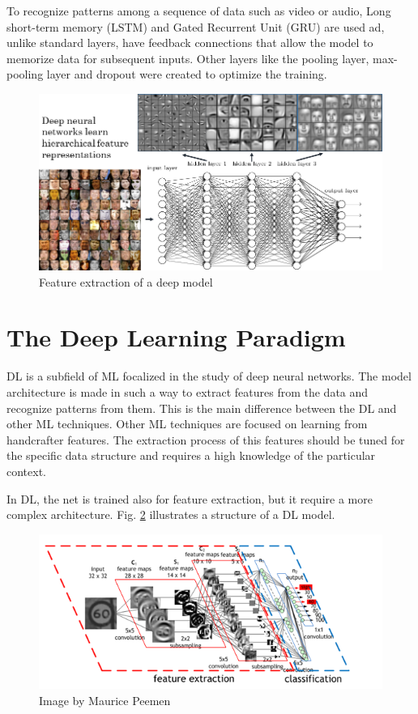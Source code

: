 \documentclass[12pt]{report}
\begin{document}
To recognize patterns among a sequence of data such as video or audio, Long short-term memory (LSTM)  and Gated Recurrent Unit (GRU) are used
ad, unlike standard layers, have feedback connections that allow the model to memorize data for subsequent inputs.
Other layers like the pooling layer, max-pooling layer and dropout were created to optimize the training.


\begin{figure}[t]
    \centering
    \includegraphics[scale=.5]{layers-features.png}
    \caption{Feature extraction of a deep model \cite{featuresextract}}
    \label{fig:featuresextract}
\end{figure}


\section{The Deep Learning Paradigm}

DL is a subfield of ML focalized in the study of deep neural networks.
The model architecture is made in such a way to extract features from the data and recognize patterns from them.
This is the main difference between the DL and other ML techniques.
Other ML techniques are focused on learning from handcrafter features.
The extraction process of this features should be tuned for the specific data structure and 
requires a high knowledge of the particular context.

In DL, the net is trained also for feature extraction, but it require a more complex architecture.
Fig. \ref{fig:dl-architecture} illustrates a structure of a DL model. 

\begin{figure}[t]
    \centering
    \includegraphics[scale=1.2]{dlarchitecture.png}
    \caption{Image by Maurice Peemen}
    \label{fig:dl-architecture}
\end{figure}
\end{document}
